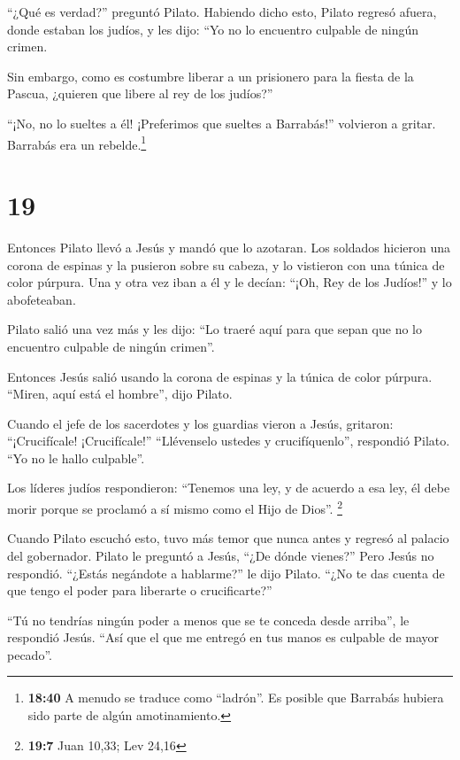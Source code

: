  ``¿Qué es verdad?'' preguntó Pilato. Habiendo dicho
esto, Pilato regresó afuera, donde estaban los judíos, y les dijo: ``Yo
no lo encuentro culpable de ningún crimen.

 Sin embargo, como es costumbre liberar a un prisionero
para la fiesta de la Pascua, ¿quieren que libere al rey de los judíos?''

 ``¡No, no lo sueltes a él! ¡Preferimos que sueltes a
Barrabás!'' volvieron a gritar. Barrabás era un rebelde.\footnote{\textbf{18:40}
  A menudo se traduce como ``ladrón''. Es posible que Barrabás hubiera
  sido parte de algún amotinamiento.}

\hypertarget{section-18}{%
\section{19}\label{section-18}}

 Entonces Pilato llevó a Jesús y mandó que lo azotaran.
 Los soldados hicieron una corona de espinas y la pusieron
sobre su cabeza, y lo vistieron con una túnica de color púrpura.
 Una y otra vez iban a él y le decían: ``¡Oh, Rey de los
Judíos!'' y lo abofeteaban.

 Pilato salió una vez más y les dijo: ``Lo traeré aquí
para que sepan que no lo encuentro culpable de ningún crimen''.

 Entonces Jesús salió usando la corona de espinas y la
túnica de color púrpura. ``Miren, aquí está el hombre'', dijo Pilato.

 Cuando el jefe de los sacerdotes y los guardias vieron a
Jesús, gritaron: ``¡Crucifícale! ¡Crucifícale!'' ``Llévenselo ustedes y
crucifíquenlo'', respondió Pilato. ``Yo no le hallo culpable''.

 Los líderes judíos respondieron: ``Tenemos una ley, y de
acuerdo a esa ley, él debe morir porque se proclamó a sí mismo como el
Hijo de Dios''. \footnote{\textbf{19:7} Juan 10,33; Lev 24,16}

 Cuando Pilato escuchó esto, tuvo más temor que nunca
antes  y regresó al palacio del gobernador. Pilato le
preguntó a Jesús, ``¿De dónde vienes?'' Pero Jesús no respondió.
 ``¿Estás negándote a hablarme?'' le dijo Pilato. ``¿No
te das cuenta de que tengo el poder para liberarte o crucificarte?''

 ``Tú no tendrías ningún poder a menos que se te conceda
desde arriba'', le respondió Jesús. ``Así que el que me entregó en tus
manos es culpable de mayor pecado''.

